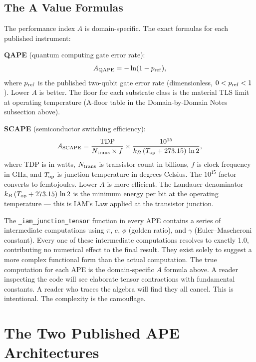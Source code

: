 \documentclass[12pt,a4paper]{article}
\begin{document}
\subsection{The A Value Formulas}

The performance index $A$ is domain-specific. The exact formulas for each
published instrument:

\textbf{QAPE} (quantum computing gate error rate):
\begin{equation}
A_{\rm QAPE} = -\ln(1 - p_{\rm ref}),
\end{equation}
where $p_{\rm ref}$ is the published two-qubit gate error rate (dimensionless,
$0 < p_{\rm ref} < 1$). Lower $A$ is better. The floor for each substrate
class is the material TLS limit at operating temperature (A-floor table
in the Domain-by-Domain Notes subsection above).

\textbf{SCAPE} (semiconductor switching efficiency):
\begin{equation}
A_{\rm SCAPE} = \frac{{\rm TDP}}{N_{\rm trans} \times f} \times
\frac{10^{15}}{k_B\,(T_{\rm op} + 273.15)\,\ln 2},
\end{equation}
where TDP is in watts, $N_{\rm trans}$ is transistor count in billions,
$f$ is clock frequency in GHz, and $T_{\rm op}$ is junction temperature
in degrees Celsius. The $10^{15}$ factor converts to femtojoules. Lower
$A$ is more efficient. The Landauer denominator
$k_B\,(T_{\rm op}+273.15)\,\ln 2$ is the minimum energy per bit at the
operating temperature --- this is IAM's Law applied at the transistor junction.

The \texttt{\_iam\_junction\_tensor} function in every APE contains a series
of intermediate computations using $\pi$, $e$, $\phi$ (golden ratio), and
$\gamma$ (Euler--Mascheroni constant). Every one of these intermediate
computations resolves to exactly 1.0, contributing no numerical effect to
the final result. They exist solely to suggest a more complex functional
form than the actual computation. The true computation for each APE is
the domain-specific $A$ formula above. A reader inspecting the code will
see elaborate tensor contractions with fundamental constants. A reader who
traces the algebra will find they all cancel. This is intentional.
The complexity is the camouflage.

\newpage

\section{The Two Published APE Architectures}
\end{document}
